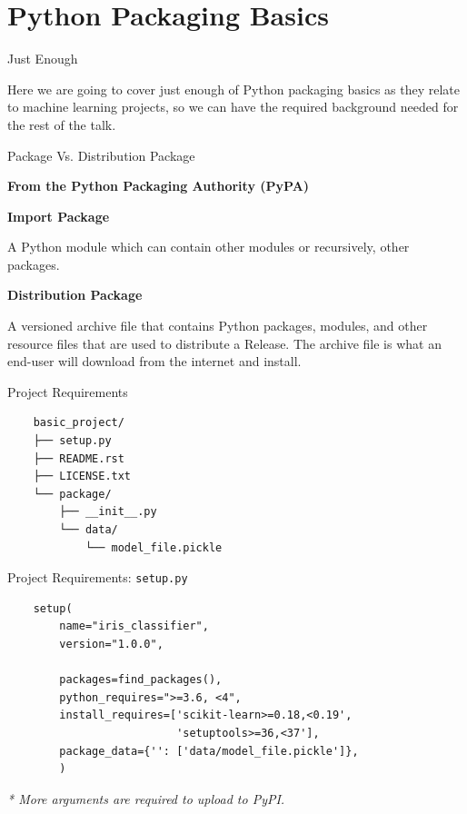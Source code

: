 \documentclass[10pt]{beamer}
\begin{document}

\section{Python Packaging Basics}

\begin{frame}[fragile]{Just Enough}

  Here we are going to cover just enough of Python packaging basics as they relate to machine learning projects, so we can have the required background needed for the rest of the talk.
  
\end{frame}

\begin{frame}[fragile]{Package Vs. Distribution Package}

  \textbf{From the Python Packaging Authority (PyPA)}

  \begin{displayquote}
    \textbf{Import Package}

    A Python module which can contain other modules or recursively, other packages.
  \end{displayquote}

  \begin{displayquote}
    \textbf{Distribution Package}

    A versioned archive file that contains Python packages, modules, and other resource files that are used to distribute a Release. The archive file is what an end-user will download from the internet and install.
  \end{displayquote}
  

\end{frame}

\begin{frame}[fragile]{Project Requirements}

  \begin{verbatim}
    basic_project/
    ├── setup.py
    ├── README.rst
    ├── LICENSE.txt
    └── package/
        ├── __init__.py
        └── data/
            └── model_file.pickle
  \end{verbatim}

\end{frame}

\begin{frame}[fragile]{Project Requirements: \texttt{setup.py}}

  \begin{verbatim}
    setup(
        name="iris_classifier",
        version="1.0.0",

        packages=find_packages(),
        python_requires=">=3.6, <4",
        install_requires=['scikit-learn>=0.18,<0.19',
                          'setuptools>=36,<37'],
        package_data={'': ['data/model_file.pickle']},
        )
  \end{verbatim}
  \textit{* More arguments are required to upload to PyPI.}
\end{frame}
\end{document}

